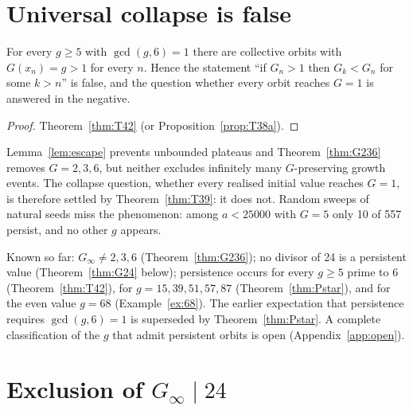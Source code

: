 \section{Universal collapse is false}

\begin{theorem}\label{thm:T39}
For every \(g\ge5\) with \(\gcd(g,6)=1\) there are collective orbits with \(G(x_n)=g>1\) for every \(n\). Hence the statement ``if \(G_n>1\) then \(G_k<G_n\) for some \(k>n\)'' is false, and the question whether every orbit reaches \(G=1\) is answered in the negative.
\end{theorem}
\begin{proof}
Theorem~\ref{thm:T42} (or Proposition~\ref{prop:T38a}).
\end{proof}

\begin{remark}\label{rem:L6}
Lemma~\ref{lem:escape} prevents unbounded plateaus and Theorem~\ref{thm:G236} removes \(G=2,3,6\), but neither excludes infinitely many \(G\)-preserving growth events. The collapse question, whether every realised initial value reaches \(G=1\), is therefore settled by Theorem~\ref{thm:T39}: it does not. Random sweeps of natural seeds miss the phenomenon: among \(a<25000\) with \(G=5\) only 10 of 557 persist, and no other \(g\) appears.
\end{remark}

\begin{remark}\label{rem:T41}
Known so far: \(G_\infty\ne2,3,6\) (Theorem~\ref{thm:G236}); no divisor of 24 is a persistent value (Theorem~\ref{thm:G24} below); persistence occurs for every \(g\ge5\) prime to 6 (Theorem~\ref{thm:T42}), for \(g=15,39,51,57,87\) (Theorem~\ref{thm:Pstar}), and for the even value \(g=68\) (Example~\ref{ex:68}). The earlier expectation that persistence requires \(\gcd(g,6)=1\) is superseded by Theorem~\ref{thm:Pstar}. A complete classification of the \(g\) that admit persistent orbits is open (Appendix~\ref{app:open}).
\end{remark}

\section{\texorpdfstring{Exclusion of \(G_\infty\mid24\)}{Exclusion of G(inf) dividing 24}}

